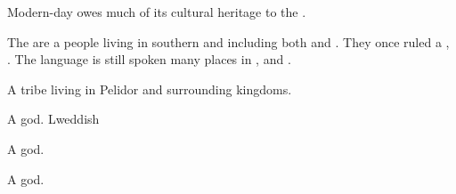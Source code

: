 \begin{gloss}
Modern-day  owes much of its cultural heritage to the \Shurco.









\begin{comment}
\paragraph{\Tepharite}
\end{comment}
\gitem[\Tepharites]{\Tepharite}
The \Tepharites{} are a people living in southern \Velcad{} and including both \scathae{} and \humans{}. 
They once ruled a , \Tepharae. 
The \Tepharin{} language is still spoken many places in ,  and . 









\begin{comment}
\paragraph{\Thbatswa}
\end{comment}
\gitem{\Thbatswa}
A \meccaran{} tribe living in Pelidor and surrounding kingdoms. 





\begin{subgloss}
  \begin{comment}
  \subparagraph{Bled}
  \end{comment}
  A  god. 
  Lweddish
  
  
  \begin{comment}
  \subparagraph{Lweddish}
  \end{comment}
  A  god. 
  
  
  \begin{comment}
  \subparagraph{Thudun}
  \end{comment}
  A  god. 
\end{subgloss}








\end{gloss}
